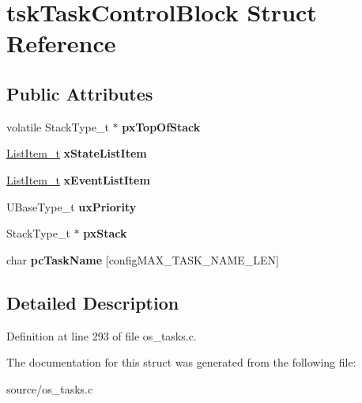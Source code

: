 \hypertarget{structtskTaskControlBlock}{}\section{tsk\+Task\+Control\+Block Struct Reference}
\label{structtskTaskControlBlock}
\subsection*{Public Attributes}
\begin{DoxyCompactItemize}
\item 
\mbox{\label{structtskTaskControlBlock_a429a186c7f8e34aba1eef5e12d215b90}} 
volatile Stack\+Type\+\_\+t $\ast$ {\bfseries px\+Top\+Of\+Stack}
\item 
\mbox{\label{structtskTaskControlBlock_a16e0d20425d53ac78537e1fdb8834cf6}} 
\mbox{\hyperlink{structxLIST__ITEM}{List\+Item\+\_\+t}} {\bfseries x\+State\+List\+Item}
\item 
\mbox{\label{structtskTaskControlBlock_a1a1612b6081a13683808284d93a9b28f}} 
\mbox{\hyperlink{structxLIST__ITEM}{List\+Item\+\_\+t}} {\bfseries x\+Event\+List\+Item}
\item 
\mbox{\label{structtskTaskControlBlock_a79187811e3d2a15595942e3b44237d85}} 
U\+Base\+Type\+\_\+t {\bfseries ux\+Priority}
\item 
\mbox{\label{structtskTaskControlBlock_a9a0d71a9f95dd0609f9911d9efd79134}} 
Stack\+Type\+\_\+t $\ast$ {\bfseries px\+Stack}
\item 
\mbox{\label{structtskTaskControlBlock_a67d61291794f38afb5be5132078bc24f}} 
char {\bfseries pc\+Task\+Name} \mbox{[}config\+M\+A\+X\+\_\+\+T\+A\+S\+K\+\_\+\+N\+A\+M\+E\+\_\+\+L\+EN\mbox{]}
\end{DoxyCompactItemize}


\subsection{Detailed Description}


Definition at line 293 of file os\+\_\+tasks.\+c.



The documentation for this struct was generated from the following file\+:\begin{DoxyCompactItemize}
\item 
source/os\+\_\+tasks.\+c\end{DoxyCompactItemize}
